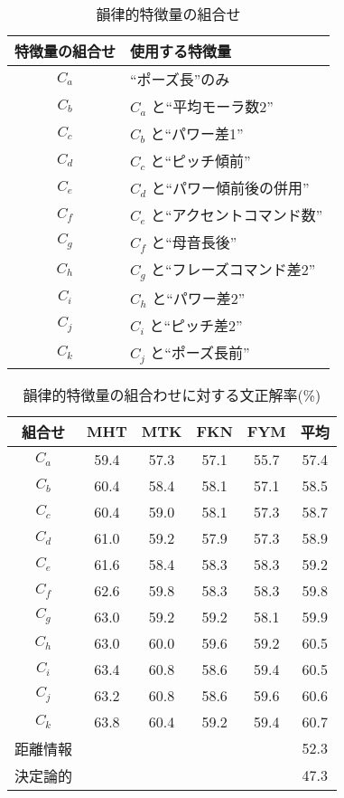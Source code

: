 \begin{table}
\begin{center}
\caption{韻律的特徴量の組合せ}
\label{cond:3}
\begin{tabular}{cl}
\hline
\hline
特徴量の組合せ & 使用する特徴量\\
\hline
$C_a$ & ``ポーズ長''のみ\\
$C_b$ & $C_a$ と``平均モーラ数2''\\
$C_c$ & $C_b$ と``パワー差1''\\
$C_d$ & $C_c$ と``ピッチ傾前''\\
$C_e$ & $C_d$ と``パワー傾前後の併用''\\
$C_f$ & $C_e$ と``アクセントコマンド数''\\
$C_g$ & $C_f$ と``母音長後''\\
$C_h$ & $C_g$ と``フレーズコマンド差2''\\
$C_i$ & $C_h$ と``パワー差2''\\
$C_j$ & $C_i$ と``ピッチ差2''\\
$C_k$ & $C_j$ と``ポーズ長前''\\
\hline
\hline
\end{tabular}
\end{center}
\end{table}

\begin{table}
\begin{center}
\caption{韻律的特徴量の組合わせに対する文正解率(\%)}
\label{res:5}
\begin{tabular}{|c|c|c|c|c|c|}
\hline
組合せ	&MHT	&MTK	&FKN	&FYM	&平均\\
\hline
\hline
$C_a$ &     59.4  &57.3  &57.1  &55.7	&57.4\\
$C_b$ &     60.4  &58.4  &58.1  &57.1	&58.5\\
$C_c$ &     60.4  &59.0  &58.1  &57.3	&58.7\\
$C_d$ &     61.0  &59.2  &57.9  &57.3	&58.9\\
$C_e$ &     61.6  &58.4  &58.3  &58.3	&59.2\\
$C_f$ &     62.6  &59.8  &58.3  &58.3	&59.8\\
$C_g$ &     63.0  &59.2  &59.2  &58.1	&59.9\\
$C_h$ &     63.0  &60.0  &59.6  &59.2	&60.5\\
$C_i$ &     63.4  &60.8  &58.6  &59.4	&60.5\\
$C_j$ &     63.2  &60.8  &58.6  &59.6	&60.6\\
$C_k$ &     63.8  &60.4  &59.2  &59.4	&60.7\\
\hline
距離情報&	&	&	&	&52.3\\
\hline
決定論的&	&	&	&	&47.3\\
\hline
\end{tabular}
\end{center}
\end{table}
\newpage

